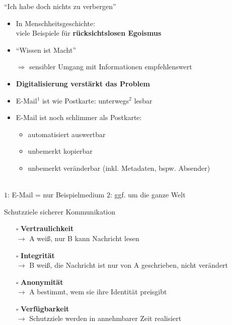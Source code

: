 \documentclass{beamer}
\begin{document}
\begin{frame}[label=ef1]{"`Ich habe doch nichts zu verbergen"'}
  
  \begin{itemize}
   \item  In Menschheitsgeschichte:\\
   viele Beispiele für \textbf{rücksichtslosen Egoismus}
   \item "`Wissen ist Macht"'
   \item[$\Rightarrow$] sensibler Umgang mit Informationen empfehlenswert\\[5mm]
   
   \pause

   \item \textbf{Digitalisierung verstärkt das Problem}
   \item E-Mail${}^1$ ist wie Postkarte: unterwegs${}^{2}$ lesbar
   \item E-Mail ist noch schlimmer als Postkarte:
   \begin{itemize}
    \item automatisiert auswertbar
    \item unbemerkt kopierbar
    \item unbemerkt veränderbar (inkl. Metadaten, bspw. Absender)
   \end{itemize}
  \end{itemize}
  
  ~\\[5mm]
  {\tiny $1$: E-Mail = nur Beispielmedium \qquad $2$: ggf. um die ganze Welt }

\end{frame}


\begin{frame}[label=ef2]{Schutzziele sicherer Kommunikation}

  \begin{itemize}
   \item[$\square$] \textbf{Vertraulichkeit}\\
   $\rightarrow$ A weiß, nur B kann Nachricht lesen

   \pause

   \item[$\square$] \textbf{Integrität}\\
   $\rightarrow$ B weiß, die Nachricht ist nur von A geschrieben, nicht verändert

   \pause

   \item[$\square$] \textbf{Anonymität}\\
   $\rightarrow$ A bestimmt, wem sie ihre Identität preisgibt

   \pause

   \item[$\square$] \textbf{Verfügbarkeit}\\
   $\rightarrow$ Schutzziele werden in annehmbarer Zeit realisiert
  \end{itemize}

\end{frame}
 
\end{document}
